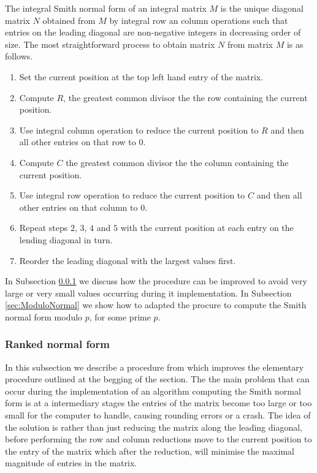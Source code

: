 \documentclass{article}
\theoremstyle{plain}
\theoremstyle{definition}
\numberwithin{thm}{section}
\begin{document}
			The integral Smith normal form of an integral matrix $M$ is the unique diagonal matrix $N$ obtained from $M$ by integral row an column operations
			such that entries on the leading diagonal are non-negative integers in decreasing order of size.
			The most straightforward process to obtain matrix $N$ from matrix $M$ is as follows.
			\begin{enumerate}
				\item
					Set the current position at the top left hand entry of the matrix.
				\item
					Compute $R$, the greatest common divisor the the row containing the current position.
				\item
					Use integral column operation to reduce the current position to $R$ and then all other entries on that row to $0$.
				\item
					Compute $C$ the greatest common divisor the the column containing the current position.
				\item
					Use integral row operation to reduce the current position to $C$ and then all other entries on that column to $0$.
				\item
					Repeat steps $2$, $3$, $4$ and $5$ with the current position at each entry on the lending diagonal in turn.
				\item
					Reorder the leading diagonal with the largest values first.
			\end{enumerate}
			
			In Subsection \ref{sec:RankedNormal} we discuss how the procedure can be improved to avoid very large or very small values occurring during it implementation.
			In Subsection \ref{sec:ModuloNormal} we show how to adapted the procure to compute the Smith normal form modulo $p$, for some prime $p$.
		
			\subsubsection{Ranked normal form}\label{sec:RankedNormal}
				
				In this subsection we describe a procedure from \cite{SmithForm} which improves the elementary procedure outlined at the begging of the section.
				The the main problem that can occur during the implementation of an algorithm computing the Smith normal form is at a intermediary stages 
				the entries of the matrix become too large or too small for the computer to handle, causing rounding errors or a crash.
				The idea of the solution is rather than just reducing the matrix along the leading diagonal, before performing the row and column
				reductions move to the current position to the entry of the matrix
				which after the reduction, will minimise the maximal magnitude of entries in the matrix.
				
\end{document}
